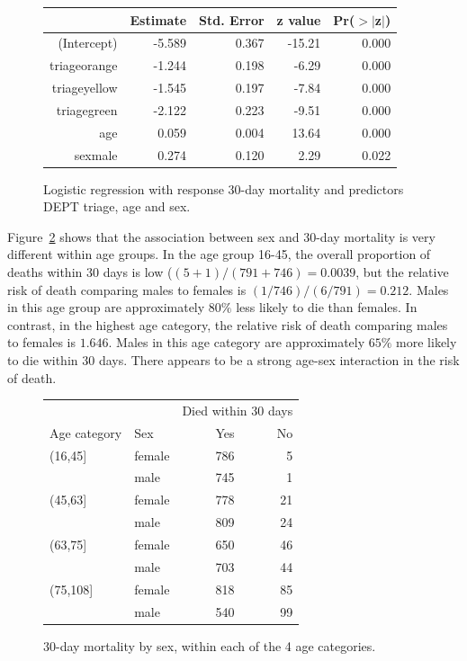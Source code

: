 \begin{figure}[ht]
\centering
\begin{tabular}{rrrrr}
  \hline
 & Estimate & Std. Error & z value & Pr($>$$|$z$|$) \\
  \hline
(Intercept) & -5.589 & 0.367 & -15.21 & 0.000 \\
  triageorange & -1.244 & 0.198 & -6.29 & 0.000 \\
  triageyellow & -1.545 & 0.197 & -7.84 & 0.000 \\
  triagegreen & -2.122 & 0.223 & -9.51 & 0.000 \\
  age & 0.059 & 0.004 & 13.64 & 0.000 \\
  sexmale & 0.274 & 0.120 & 2.29 & 0.022 \\
   \hline
\end{tabular}
\caption{Logistic regression with response 30-day mortality and
       predictors DEPT triage, age and sex.}
\label{figure:triageAgeSexMort30logreg}
\end{figure}



Figure~\ref{figure:mort30SexWithinAgeGroupTable} shows that the association between sex and 30-day mortality is very different within age groups.  In the age group 16-45, the overall proportion of deaths within 30 days is low ($(5 + 1)/(791 + 746) = 0.0039$, but the relative risk of death comparing males to females is $(1/746)/(6/791) = 0.212$.  Males in this age group are approximately $80\%$ less likely to die than females.  In contrast, in the highest age category, the relative risk of death comparing males to females is $1.646$.  Males in this age category are approximately $65\%$ more likely to die within 30 days.  There appears to be a strong age-sex interaction in the risk of death.

\begin{figure}[ht]
\centering
\begin{tabular}{llrr}
  \hline
    & & \multicolumn{2}{c}{Died within 30 days}   \\
Age category & Sex & Yes & No \\
\hline
(16,45] & female  &    786 &  5 \\
        & male    &    745 &  1 \\
(45,63] & female  &    778 & 21 \\
        & male    &    809 & 24 \\
(63,75] & female  &    650 & 46 \\
        & male    &    703 &  44 \\
(75,108] & female &     818 & 85 \\
         & male   &     540 & 99 \\
\hline
\end{tabular}
\caption{30-day mortality by sex, within each of the 4 age categories.}
\label{figure:mort30SexWithinAgeGroupTable}
\end{figure}

